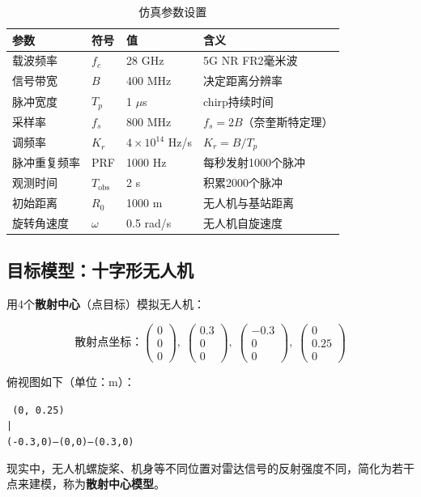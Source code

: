 \documentclass[12pt, a4paper]{article}
\begin{document}
\begin{table}[H]
\centering
\begin{tabular}{llll}
\toprule
参数 & 符号 & 值 & 含义 \\
\midrule
载波频率 & $f_c$ & 28 GHz & 5G NR FR2毫米波 \\
信号带宽 & $B$ & 400 MHz & 决定距离分辨率 \\
脉冲宽度 & $T_p$ & 1 $\mu$s & chirp持续时间 \\
采样率 & $f_s$ & 800 MHz & $f_s = 2B$（奈奎斯特定理）\\
调频率 & $K_r$ & $4\times10^{14}$ Hz/s & $K_r = B/T_p$ \\
脉冲重复频率 & PRF & 1000 Hz & 每秒发射1000个脉冲 \\
观测时间 & $T_\text{obs}$ & 2 s & 积累2000个脉冲 \\
初始距离 & $R_0$ & 1000 m & 无人机与基站距离 \\
旋转角速度 & $\omega$ & 0.5 rad/s & 无人机自旋速度 \\
\bottomrule
\end{tabular}
\caption{仿真参数设置}
\end{table}

\subsection{目标模型：十字形无人机}

用4个\textbf{散射中心}（点目标）模拟无人机：

\begin{equation}
\text{散射点坐标：}
\begin{pmatrix} 0 \\ 0 \\ 0 \end{pmatrix},\;
\begin{pmatrix} 0.3 \\ 0 \\ 0 \end{pmatrix},\;
\begin{pmatrix} -0.3 \\ 0 \\ 0 \end{pmatrix},\;
\begin{pmatrix} 0 \\ 0.25 \\ 0 \end{pmatrix}
\end{equation}

俯视图如下（单位：m）：
\begin{center}
\texttt{
(0, 0.25) \\
\quad\quad | \\
(-0.3,0)---\!(0,0)\!---(0.3,0)
}
\end{center}
现实中，无人机螺旋桨、机身等不同位置对雷达信号的反射强度不同，简化为若干点来建模，称为\textbf{散射中心模型}。
\end{document}

